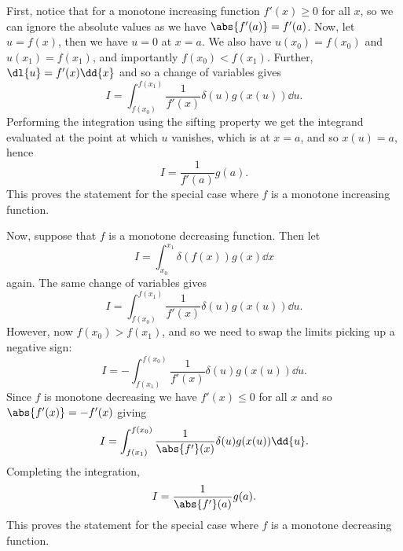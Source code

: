 First, notice that for a monotone increasing function \(f'(x) \ge 0\) for all \(x\), so we can ignore the absolute values as we have \(\abs{f'(a)} = f'(a)\).
Now, let \(u = f(x)\), then we have \(u = 0\) at \(x = a\).
We also have \(u(x_0) = f(x_0)\) and \(u(x_1) = f(x_1)\), and importantly \(f(x_0) < f(x_1)\).
Further, \(\dl{u} = f'(x) \dd{x}\) and so a change of variables gives
\begin{equation}
    I = \int_{f(x_0)}^{f(x_1)} \frac{1}{f'(x)} \delta(u) g(x(u)) \dd{u}.
\end{equation}
Performing the integration using the sifting property we get the integrand evaluated at the point at which \(u\) vanishes, which is at \(x = a\), and so \(x(u) = a\), hence
\begin{equation}
    I = \frac{1}{f'(a)} g(a).
\end{equation}
This proves the statement for the special case where \(f\) is a monotone increasing function.

Now, suppose that \(f\) is a monotone decreasing function.
Then let
\begin{equation}
    I = \int_{x_0}^{x_1} \delta(f(x)) g(x) \dd{x}
\end{equation}
again.
The same change of variables gives
\begin{equation}
    I = \int_{f(x_0)}^{f(x_1)} \frac{1}{f'(x)} \delta(u) g(x(u)) \dd{u}.
\end{equation}
However, now \(f(x_0) > f(x_1)\), and so we need to swap the limits picking up a negative sign:
\begin{equation}
    I = -\int_{f(x_1)}^{f(x_0)} \frac{1}{f'(x)} \delta(u) g(x(u)) \dd{u}.
\end{equation}
Since \(f\) is monotone decreasing we have \(f'(x) \le 0\) for all \(x\) and so \(\abs{f'(x)} = -f'(x)\) giving
\begin{equation}
    I = \int_{f(x_1)}^{f(x_0)} \frac{1}{\abs{f'}(x)} \delta(u) g(x(u)) \dd{u}.
\end{equation}
Completing the integration,
\begin{equation}
    I = \frac{1}{\abs{f'}(a)} g(a).
\end{equation}
This proves the statement for the special case where \(f\) is a monotone decreasing function.


